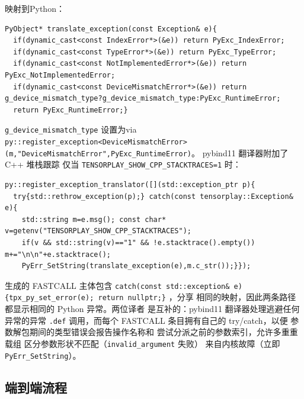 映射到Python：

\begin{lstlisting}[caption={map.}, label=lst:translate]
PyObject* translate_exception(const Exception& e){
  if(dynamic_cast<const IndexError*>(&e)) return PyExc_IndexError;
  if(dynamic_cast<const TypeError*>(&e)) return PyExc_TypeError;
  if(dynamic_cast<const NotImplementedError*>(&e)) return PyExc_NotImplementedError;
  if(dynamic_cast<const DeviceMismatchError*>(&e)) return g_device_mismatch_type?g_device_mismatch_type:PyExc_RuntimeError;
  return PyExc_RuntimeError;}
\end{lstlisting}

\texttt{g\_device\_mismatch\_type} 设置为via
\texttt{py::register\_exception<DeviceMismatchError>(m,"DeviceMismatchError",PyExc\_RuntimeError)}。
pybind11 翻译器附加了 C++ 堆栈跟踪
仅当 \texttt{TENSORPLAY\_SHOW\_CPP\_STACKTRACES=1} 时：

\begin{lstlisting}[caption={translator.}, label=lst:pytranslator]
py::register_exception_translator([](std::exception_ptr p){
  try{std::rethrow_exception(p);} catch(const tensorplay::Exception& e){
    std::string m=e.msg(); const char* v=getenv("TENSORPLAY_SHOW_CPP_STACKTRACES");
    if(v && std::string(v)=="1" && !e.stacktrace().empty()) m+="\n\n"+e.stacktrace();
    PyErr_SetString(translate_exception(e),m.c_str());}});
\end{lstlisting}

生成的 FASTCALL 主体包含
\texttt{catch(const std::exception\& e)\{tpx\_py\_set\_error(e); return nullptr;\}}
，分享
相同的映射，因此两条路径都显示相同的 Python 异常。两位译者
是互补的：pybind11 翻译器处理逃避任何异常的异常
\texttt{.def} 调用，而每个 FASTCALL 条目拥有自己的 try/catch，以便
参数解包期间的类型错误会报告操作名称和
尝试分派之前的参数索引，允许多重重载组
区分参数形状不匹配（\texttt{invalid\_argument} 失败）
来自内核故障（立即 \texttt{PyErr\_SetString}）。

\subsection{端到端流程}
\label{sec:e2e}

